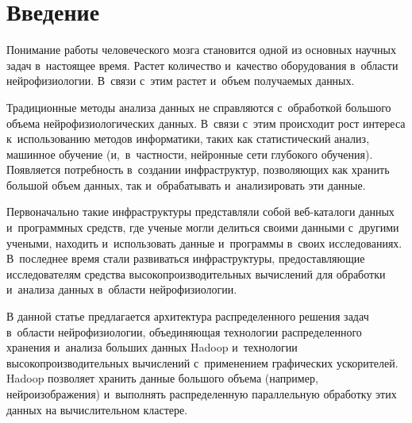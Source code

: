 

\vspace*{8pt}


\thispagestyle{headings}

\begin{multicols}{2}

\label{st\stat}

\section{Введение}


    Понимание работы человеческого мозга становится одной из основных 
научных задач в~на\-сто\-ящее время. Рас\-тет количество и~качество 
оборудования в~области нейрофизиологии. В~связи с~этим растет и~объем 
получаемых данных. 

Традиционные методы анализа данных не справляются 
с~обработкой большого объема нейрофизиологических данных. В~связи 
с~этим происходит рост интереса к~использованию методов информатики, 
таких как статистический анализ, машинное обуче\-ние (и,~в~част\-ности, 
нейронные сети глубокого обуче\-ния). Появляется потребность в~создании 
инфраструктур, позволяющих как хранить большой объем данных, так 
и~обрабатывать и~анализировать эти данные.
    
    Первоначально такие инфраструктуры пред\-став\-ля\-ли собой веб-ка\-та\-ло\-ги 
данных и~программных средств, где ученые могли делиться своими данными с~другими учеными, 
находить и~использовать данные и~программы в~своих 
исследованиях. В~последнее время стали развиваться инфраструктуры, 
предоставляющие исследователям средства высокопроизводительных 
вычислений для обработки и~анализа данных в~области нейрофизиологии. 

    
    В данной статье предлагается архитектура распределенного решения 
задач в~области нейрофизиологии, объединяющая технологии 
распределенного хранения и~анализа больших данных Hadoop и~технологии 
высокопроизводительных вычислений с~применением графических 
ускорителей. Hadoop позволяет хранить данные большого объема (например, 
нейроизображения) и~выполнять распределенную параллельную обработку 
этих данных на вычислительном кластере. 


\end{multicols}

